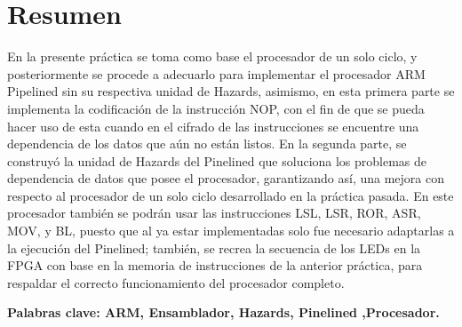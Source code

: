 \section*{Resumen}

En la presente práctica se toma como base el procesador de un solo ciclo, y posteriormente se procede a adecuarlo para implementar el procesador ARM Pipelined sin su respectiva unidad de Hazards, asimismo, en esta primera parte se implementa la codificación de la instrucción NOP, con el fin de que se pueda hacer uso de esta cuando en el cifrado de las instrucciones se encuentre una dependencia de los datos que aún no están listos. En la segunda parte, se construyó la unidad de Hazards del Pinelined que soluciona los problemas de dependencia de datos que posee el procesador, garantizando así, una mejora con respecto al procesador de un solo ciclo desarrollado en la práctica pasada. En este procesador también se podrán usar las instrucciones LSL, LSR, ROR, ASR, MOV, y BL, puesto que al ya estar implementadas solo fue necesario adaptarlas a la ejecución del Pinelined; también, se recrea la secuencia de los LEDs en la FPGA con base en la memoria de instrucciones de la anterior práctica, para respaldar el correcto funcionamiento del procesador completo.

\footnotesize\textbf{Palabras clave: ARM,  Ensamblador, Hazards,  Pinelined ,Procesador.} 

     

    

